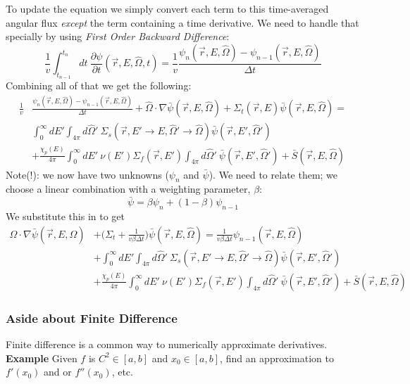 \documentclass[12pt]{article}
\newcommand{\rvec}{\ensuremath{\vec{r}}}
\newcommand{\omvec}{\ensuremath{\hat{\Omega}}}
\newcommand{\vOmega}{\ensuremath{\hat{\Omega}}}
\begin{document}
To update the equation we simply convert each term to this time-averaged angular flux \textit{except} the term containing a time derivative. We need to handle that specially by using \textit{First Order Backward Difference}: 
\[
\frac{1}{v} \int_{t_{n-1}}^{t_n} dt\:\frac{\partial \psi}{\partial t}(\rvec,E,\omvec,t) = \frac{1}{v}\frac{\psi_n(\vec{r}, E ,\vOmega) - \psi_{n-1}(\vec{r}, E ,\vOmega)}{\Delta t}
\]
Combining all of that we get the following:
\begin{align*}
\frac{1}{v}&\frac{\psi_n(\vec{r}, E ,\vOmega) - \psi_{n-1}(\vec{r}, E ,\vOmega)}{\Delta t} 
+ \omvec\cdot  \nabla  \bar{\psi}(\vec{r}, E ,\vOmega) 
+ \Sigma_t(\rvec,E)\bar{\psi}(\vec{r}, E ,\vOmega) 
= \\& \int_0^{\infty}dE'\int_{4\pi}d\omvec'\: \Sigma_s(\rvec, E'\rightarrow E,\omvec'\rightarrow\omvec) \bar{\psi}(\vec{r}, E' ,\vOmega')
\\&+ \frac{\chi_p(E)}{4\pi}\int_0^{\infty}dE'\:\nu(E')\Sigma_f(\rvec,E')\int_{4\pi}d\omvec'\:
\bar{\psi}(\vec{r}, E' ,\vOmega')
+\bar{S}(\rvec, E, \omvec)
\end{align*}
Note(!): we now have two unknowns ($\psi_n$ and $\bar{\psi}$). We need to relate them; we choose a linear combination with a weighting parameter, $\beta$:
\[
\bar{\psi} = \beta \psi_n + (1 - \beta)\psi_{n-1}
\]
We substitute this in to get
\begin{align*}
\omvec\cdot  \nabla  \bar{\psi}(\vec{r}, E ,\vOmega) 
&+ \bigl(\Sigma_t + \frac{1}{v \beta \Delta t}\bigr)\bar{\psi}(\vec{r}, E ,\vOmega) 
=  \frac{1}{v \beta \Delta t} \psi_{n-1}(\vec{r}, E ,\vOmega) \\
&+ \int_0^{\infty}dE'\int_{4\pi}d\omvec'\: \Sigma_s(\rvec, E'\rightarrow E,\omvec'\rightarrow\omvec) \bar{\psi}(\vec{r}, E' ,\vOmega')
\\&+ \frac{\chi_p(E)}{4\pi}\int_0^{\infty}dE'\:\nu(E')\Sigma_f(\rvec,E')\int_{4\pi}d\omvec'\:
\bar{\psi}(\vec{r}, E' ,\vOmega')
+\bar{S}(\rvec, E, \omvec)
\end{align*}


\subsubsection*{Aside about Finite Difference}
Finite difference is a common way to numerically approximate derivatives.  \textbf{Example} Given $f$ is $ C^2 \in [a,b]$ and $x_0 \in [a,b]$, find an approximation to $f'(x_0)$ and or $f''(x_0)$, etc.
\end{document}
